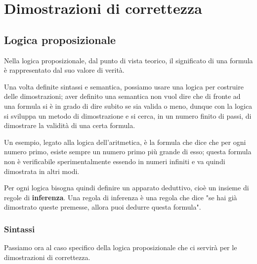 \chapter{Dimostrazioni di correttezza}
\section{Logica proposizionale}
Nella logica proposizionale, dal punto di vista teorico, il significato di una
formula è rappresentato dal suo valore di verità.

Una volta definite sintassi e semantica, possiamo usare una logica per costruire
delle dimostrazioni; aver definito una semantica non vuol dire che di fronte ad
una formula si è in grado di dire subito se sia valida o meno, dunque con la logica
si sviluppa un metodo di dimostrazione e si cerca, in un numero finito di passi,
di dimostrare la validità di una certa formula.

Un esempio, legato alla logica dell'aritmetica, è la formula che dice che per ogni
numero primo, esiste sempre un numero primo più grande di esso; questa formula
non è verificabile sperimentalmente essendo in numeri infiniti e va quindi
dimostrata in altri modi.

Per ogni logica bisogna quindi definire un apparato deduttivo, cioè un insieme di
regole di \textbf{inferenza}. Una regola di inferenza è una regola che dice "se
hai già dimostrato queste premesse, allora puoi dedurre questa formula".

\subsection{Sintassi}
Passiamo ora al caso specifico della logica proposizionale che ci servirà per le
dimostrazioni di correttezza.


